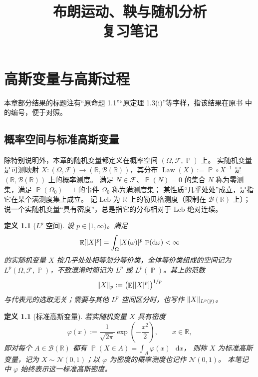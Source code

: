 \documentclass[UTF8,11pt,a4paper,oneside,fontset=fandol]{ctexrep}
\title{布朗运动、鞅与随机分析\\复习笔记}
\author{}
\date{}
\numberwithin{equation}{section}
\theoremstyle{zhthm}
\newtheorem{definition}[theorem]{定义}
\newcommand{\R}{\mathbb{R}}
\newcommand{\B}{\mathcal{B}}
\newcommand{\F}{\mathcal{F}}
\DeclareMathOperator{\Prob}{\mathbb{P}}
\DeclareMathOperator{\E}{\mathbb{E}}
\DeclareMathOperator{\Law}{Law}
\newcommand{\Leb}{\mathrm{Leb}}
\newcommand{\Normal}{\mathcal{N}}
\newcommand{\dd}{\mathop{}\!\mathrm{d}}
\DeclarePairedDelimiter{\abs}{\lvert}{\rvert}
\DeclarePairedDelimiter{\norm}{\lVert}{\rVert}
\begin{document}
\maketitle

\tableofcontents
\clearpage
{}

\chapter{高斯变量与高斯过程}
\label{chap:gaussian}
本章部分结果的标题注有“原命题 1.1”“原定理 1.3(i)”等字样，指该结果在原书\cite{LeGall2016} 中的编号，便于对照。

\section{概率空间与标准高斯变量}
\label{sec:standard-gaussian}

除特别说明外，本章的随机变量都定义在概率空间 $(\Omega,\F,\Prob)$ 上。
实随机变量是可测映射 $X:(\Omega,\F)\to(\R,\B(\R))$，其分布
$\Law(X):=\Prob\circ X^{-1}$ 是 $(\R,\B(\R))$ 上的概率测度。
满足 $N\in\F$、$\Prob(N)=0$ 的集合 $N$ 称为零测集，满足 $\Prob(\Omega_0)=1$ 的事件 $\Omega_0$ 称为满测度集；
某性质“几乎处处”成立，是指它在某个满测度集上成立。
记 $\Leb$ 为 $\R$ 上的勒贝格测度（限制在 $\B(\R)$ 上）；
说一个实随机变量“具有密度”，总是指它的分布相对于 $\Leb$ 绝对连续。

\begin{definition}[$L^p$ 空间]
\label{def:lp}
设 $p\in[1,\infty)$。满足
\[
  \E[\abs{X}^p]=\int_\Omega\abs{X(\omega)}^p\,\Prob(\dd\omega)<\infty
\]
的实随机变量 $X$ 按几乎处处相等划分等价类，全体等价类组成的空间记为
$L^p(\Omega,\F,\Prob)$，不致混淆时简记为 $L^p$ 或 $L^p(\Prob)$。其上的范数
\[
  \norm{X}_p:=\bigl(\E[\abs{X}^p]\bigr)^{1/p}
\]
与代表元的选取无关；需要与其他 $L^p$ 空间区分时，也写作 $\norm{X}_{L^p(\Prob)}$。
\end{definition}

\begin{definition}[标准高斯变量]
\label{def:standard-gaussian}
若实随机变量 $X$ 具有密度
\[
  \varphi(x):=\frac{1}{\sqrt{2\pi}}\exp\!\left(-\frac{x^2}{2}\right),
  \qquad x\in\R,
\]
即对每个 $A\in\B(\R)$ 都有 $\Prob(X\in A)=\int_A\varphi(x)\,\dd x$，
则称 $X$ 为标准高斯变量，记为 $X\sim\Normal(0,1)$；以 $\varphi$ 为密度的概率测度也记作 $\Normal(0,1)$。
本笔记中 $\varphi$ 始终表示这一标准高斯密度。
\end{definition}
\end{document}
